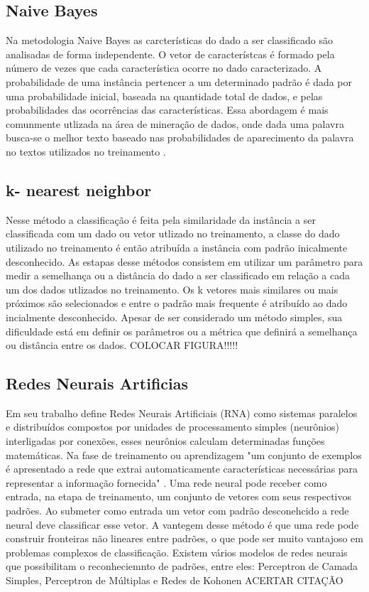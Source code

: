 \subsection{Naive Bayes}
Na metodologia Naive Bayes as carcterísticas do dado a ser classificado são analisadas de forma independente. O vetor de característcas é formado pela número de vezes que cada característica ocorre no dado caracterizado. A probabilidade de uma instância pertencer a um determinado padrão é dada por uma probabilidade inicial, baseada na quantidade total de dados, e pelas probabilidades das ocorrências das características. Essa abordagem é mais comunmente utlizada na área de mineração de dados, onde dada uma palavra busca-se o melhor texto baseado nas probabilidades de aparecimento da palavra no textos utilizados no treinamento \cite{McCallum98Bayes}\cite{Langley92Bayes}.

\subsection{k- nearest neighbor}
Nesse método a classificação é feita pela similaridade da instância a ser classificada com um dado ou vetor utlizado no treinamento, a classe do dado utilizado no treinamento é então atribuída a instância com padrão inicalmente desconhecido. As estapas desse métodos consistem em utilizar um parâmetro para medir a semelhança ou a distância do dado a ser classificado em relação a cada um dos dados utlizados no treinamento. Os k vetores mais similares ou mais próximos são selecionados e entre o padrão mais frequente é atribuído ao dado incialmente desconhecido. Apesar de ser considerado um método simples, sua dificuldade está em definir os parâmetros ou a métrica que definirá a semelhança ou distância entre os dados\cite{Chagas09KNN}.
COLOCAR FIGURA!!!!!

\subsection{Redes Neurais Artificias}
Em seu trabalho   define Redes Neurais Artificiais (RNA) como sistemas paralelos e distribuídos compostos por unidades de processamento simples (neurônios) interligadas por conexões, esses neurônios calculam determinadas funções matemáticas. Na fase de treinamento ou aprendizagem "um conjunto de exemplos é apresentado a rede que extrai automaticamente características necessárias para representar a informação fornecida" \cite{Morais2010RNA}.
Uma rede neural pode receber como entrada, na etapa de treinamento, um conjunto de vetores com seus respectivos padrões. Ao submeter como entrada um vetor com padrão desconehcido a rede neural deve classificar esse vetor. A vantegem desse método é que uma rede pode construir fronteiras não lineares entre padrões, o que pode ser muito vantajoso em problemas complexos de classificação. Existem vários modelos de redes neurais que possibilitam o reconheciemnto de padrões, entre eles: Perceptron de Camada Simples, Perceptron de Múltiplas e Redes de Kohonen \cite{ZubenRNA2}  ACERTAR CITAÇÃO%

